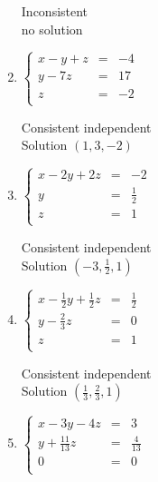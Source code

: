 \documentclass{ximera}
\begin{document}
\begin{enumerate}
Inconsistent\\
no solution




\item $\left\{ \begin{array}{rcr} x-y+z & = & -4  \\ y - 7z & = & 17 \\ z & = & -2 \\  \end{array} \right.$
\vspace{.25in}

Consistent independent\\
Solution $(1,3,-2)$


\item $\left\{ \begin{array}{rcr} x-2y+2z & = & -2  \\ y  & = & \frac{1}{2} \\ z & = & 1 \\  \end{array} \right.$
\vspace{.25in}

Consistent independent\\
Solution $\left(-3,\frac{1}{2},1\right)$


\item $\left\{ \begin{array}{rcr} x-\frac{1}{2} y+\frac{1}{2} z & = & \frac{1}{2}  \\ [3pt] y - \frac{2}{3} z & = & 0 \\ z & = & 1 \\  \end{array} \right.$
\vspace{.25in}

Consistent independent\\
Solution $\left(\frac{1}{3},\frac{2}{3},1\right)$



\item $\left\{ \begin{array}{rcr} x-3y-4z & = & 3  \\ y + \frac{11}{13} z & = & \frac{4}{13} \\ 0 & = & 0 \\  \end{array} \right.$
\vspace{.25in}


\end{enumerate}
\end{document}
